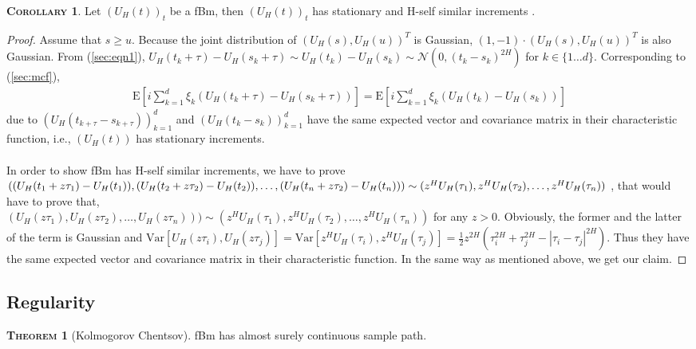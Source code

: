 \documentclass[a4paper, twoside, 11pt]{article}
\theoremstyle{definition}
\newtheorem{theorem}[definition]{\scshape Theorem}
\newtheorem{corollary}[definition]{\scshape Corollary}
\begin{document}
  \begin{corollary}
	Let $(U_H(t))_{t}$ be a fBm, then $(U_H(t))_{t}$ has stationary and H-self similar increments . 
  \end{corollary}
  \begin{proof}
	Assume that $s \ge u $. Because the joint distribution of $(U_H(s), U_H(u))^T$ is Gaussian, $(1, -1) \cdot (U_H(s), U_H(u))^T $ is also Gaussian. From (\ref{sec:eqn1}),  $U_H(t_k+\tau) - U_H(s_k+\tau) \sim U_H(t_k) - U_H(s_k) \sim \mathcal{N}(0, (t_k - s_k)^{2H})$ for $k \in \{1\dots d\}$. Corresponding to  (\ref{sec:mcf}), 
	  \begin{eqnarray*}
	  \mathrm{E}[i\sum_{k=1}^{d}\xi_k (U_H(t_k + \tau) - U_H(s_k + \tau))] = \mathrm{E} [i\sum_{k=1}^{d}\xi_k (U_H(t_k) - U_H(s_k))]
	\end{eqnarray*}
	due to $(U_H(t_{k+\tau} - s_{k+\tau}))_{k=1}^{d}$ and $(U_H(t_k - s_k))_{k=1}^{d}$ have the same expected vector and covariance matrix in their characteristic function, i.e., $(U_H(t))$ has stationary increments.\\
	\\
	 In order to show fBm has H-self similar increments, we have to prove\\ 
	 $((U_H(t_1+z\tau_1) - U_H(t_1)), (U_H(t_2+z\tau_2) - U_H(t_2)),\dots, (U_H(t_n+z\tau_2) - U_H(t_n))) \sim \\
	 (z^HU_H(\tau_1), z^HU_H(\tau_2),\dots, z^HU_H(\tau_n))$ , that would have to prove that,\\
	 $(U_H(z\tau_1), U_H(z\tau_2),\dots, U_H(z\tau_n))) \sim (z^HU_H(\tau_1), z^HU_H(\tau_2),\dots, z^HU_H(\tau_n))$ for any $z > 0$. Obviously, the former and the latter of the term is Gaussian and $\mathrm{Var}[U_H(z\tau_i), U_H(z\tau_j)] = \mathrm{Var}[z^HU_H(\tau_i), z^HU_H(\tau_j)] = \frac{1}{2}z^{2H}(\tau_i^{2H} + \tau_j^{2H} - |\tau_i-\tau_j|^{2H})$. Thus they have the same expected vector and covariance matrix in their characteristic function. In the same way as mentioned above, we get our claim.
  \end{proof}

  \subsection{Regularity}
  \begin{theorem}[Kolmogorov Chentsov]
	fBm has almost surely continuous sample path.  
  \end{theorem}
\end{document}
